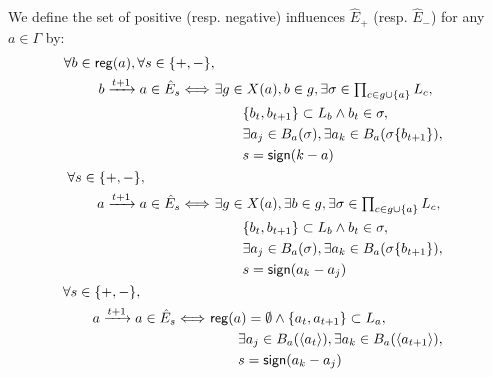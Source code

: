 \begin{proposition}\label{pps:inference-edges}
We define the set of positive (resp. negative) influences $\hat{E}_+$ (resp. $\hat{E}_-$) for any $a\in\Gamma$ by:
\begin{align}
\begin{split}\label{eq:edges-inference}
  \forall b\in\PHpredecgene{a}, \forall s \in \{ +, - \}, \\
  b \xrightarrow{t+1} a \in \hat{E}_s \Longleftrightarrow\ & \exists g \in X(a), b \in g,
  \exists \sigma \in \textstyle\prod_{c\in g \cup \{ a \}} \PHl_c, \\
    &\qquad \{ b_t, b_{t+1} \} \subset \PHl_b \wedge b_t \in \sigma,\\
    &\qquad \exists a_j \in \irB_a(\sigma), \exists a_k \in \irB_a(\sigma\{b_{t+1}\}), \\
    &\qquad s = \f{sign}(k - a)
\end{split}\\
%
%
\begin{split}\label{eq:edges-inference-auto}
  \forall s \in \{ +, - \}, \quad\qquad\qquad \\
  a \xrightarrow{t+1} a \in \hat{E}_s \Longleftrightarrow\ & \exists g \in X(a), \exists b \in g,
  \exists \sigma \in \textstyle\prod_{c\in g \cup \{ a \}} \PHl_c, \\
    &\qquad \{ b_t, b_{t+1} \} \subset \PHl_b \wedge b_t \in \sigma,\\
    &\qquad \exists a_j \in \irB_a(\sigma), \exists a_k \in \irB_a(\sigma\{b_{t+1}\}), \\
    &\qquad s = \f{sign}(a_k - a_j)
\end{split}\\
\begin{split}\label{eq:edges-inference-noreg}
  \forall s \in \{ +, - \}, \quad\qquad\qquad \\
  a \xrightarrow{t+1} a \in \hat{E}_s \Longleftrightarrow\ & \reg{a} = \emptyset \wedge \{ a_t, a_{t+1} \} \subset \PHl_a, \\
    &\qquad \exists a_j \in \irB_a(\PHetat{a_t}), \exists a_k \in \irB_a(\PHetat{a_{t+1}}), \\
    &\qquad s = \f{sign}(a_k - a_j)
\end{split}
%
%

\end{align}
\end{proposition}
